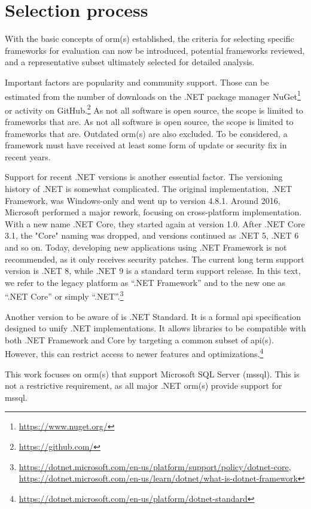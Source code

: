 \section{Selection process}
With the basic concepts of \acrshort{orm}(s) established, the criteria for selecting specific frameworks for evaluation can now be introduced, potential frameworks reviewed, and a representative subset ultimately selected for detailed analysis.

Important factors are popularity and community support. Those can be estimated from the number of downloads on the .NET package manager NuGet\footnote{\url{https://www.nuget.org/}} or activity on GitHub.\footnote{\url{https://github.com/}} As not all software is open source, the scope is limited to frameworks that are. As not all software is open source, the scope is limited to frameworks that are. Outdated \acrshort{orm}(s) are also excluded. To be considered, a framework must have received at least some form of update or security fix in recent years.

Support for recent .NET versions is another essential factor. The versioning history of .NET is somewhat complicated. The original implementation, .NET Framework, was Windows-only and went up to version 4.8.1. Around 2016, Microsoft performed a major rework, focusing on cross-platform implementation. With a new name .NET Core, they started again at version 1.0. After .NET Core 3.1, the "Core" naming was dropped, and versions continued as .NET 5, .NET 6 and so on. Today, developing new applications using .NET Framework is not recommended, as it only receives security patches. The current long term support version is .NET 8, while .NET 9 is a standard term support release. In this text, we refer to the legacy platform as ``.NET Framework'' and to the new one as ``.NET Core'' or simply ``.NET''.\footnote{\url{https://dotnet.microsoft.com/en-us/platform/support/policy/dotnet-core}, \url{https://dotnet.microsoft.com/en-us/learn/dotnet/what-is-dotnet-framework}}

Another version to be aware of is .NET Standard. It is a formal \acrshort{api} specification designed to unify .NET implementations. It allows libraries to be compatible with both .NET Framework and Core by targeting a common subset of \acrshort{api}(s). However, this can restrict access to newer features and optimizations.\footnote{\url{https://dotnet.microsoft.com/en-us/platform/dotnet-standard}}

This work focuses on \acrshort{orm}(s) that support Microsoft SQL Server (\acrshort{mssql}). This is not a restrictive requirement, as all major .NET \acrshort{orm}(s) provide support for \acrshort{mssql}.

